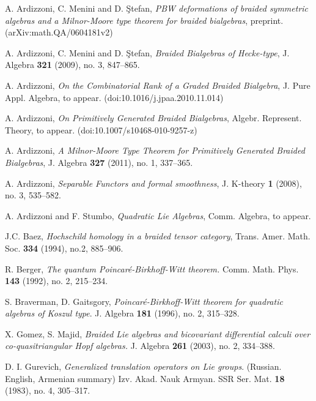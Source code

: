 \documentclass[english]{amsart}
\numberwithin{equation}{section}
\numberwithin{figure}{section}
\theoremstyle{plain}
\theoremstyle{definition}
\theoremstyle{definition}
\theoremstyle{remark}
\theoremstyle{remark}
\theoremstyle{plain}
\theoremstyle{plain}
\theoremstyle{plain}
\begin{document}
\begin{thebibliography}{}
 A. Ardizzoni, C. Menini and D. \c{S}tefan,
\emph{PBW deformations of braided symmetric algebras and a Milnor-Moore
type theorem for braided bialgebras}, preprint. (arXiv:math.QA/0604181v2)

A. Ardizzoni, C. Menini and D. \c{S}tefan,
\emph{Braided Bialgebras of Hecke-type}, J. Algebra \textbf{321} (2009), no. 3, 847--865. 

A. Ardizzoni, \emph{On the Combinatorial
Rank of a Graded Braided Bialgebra}, J. Pure Appl. Algebra, to appear. (doi:10.1016/j.jpaa.2010.11.014)  

 A. Ardizzoni, \emph{On Primitively
Generated Braided Bialgebras}, Algebr. Represent. Theory, to appear. (doi:10.1007/s10468-010-9257-z)

 A. Ardizzoni, \emph{A Milnor-Moore
Type Theorem for Primitively Generated Braided Bialgebras}, J. Algebra \textbf{327} (2011), no. 1, 337--365. 

 A. Ardizzoni, \emph{Separable Functors
and formal smoothness}, J. K-theory \textbf{1} (2008), no. 3, 535--582. 

 A. Ardizzoni and F. Stumbo, \emph{Quadratic Lie Algebras},  Comm. Algebra, to appear.

 J.C. Baez, \emph{Hochschild homology in a braided
tensor category}, Trans. Amer. Math. Soc. \textbf{334} (1994), no.2, 885--906.

 R. Berger, \emph{The quantum Poincaré-Birkhoff-Witt theorem.}
Comm. Math. Phys. \textbf{143} (1992), no. 2, 215--234. 

 S. Braverman, D. Gaitsgory, \emph{Poincaré-Birkhoff-Witt
theorem for quadratic algebras of Koszul type}. J. Algebra \textbf{181}
(1996), no. 2, 315--328.

 X. Gomez, S. Majid, \emph{Braided Lie algebras and bicovariant differential calculi over co-quasitriangular Hopf algebras.} J. Algebra \textbf{261} (2003), no. 2, 334--388.

 D. I. Gurevich, \emph{Generalized
translation operators on Lie groups}. (Russian. English, Armenian summary)
Izv. Akad. Nauk Armyan. SSR Ser. Mat. \textbf{18} (1983), no. 4, 305--317.


\end{thebibliography}
\end{document}
